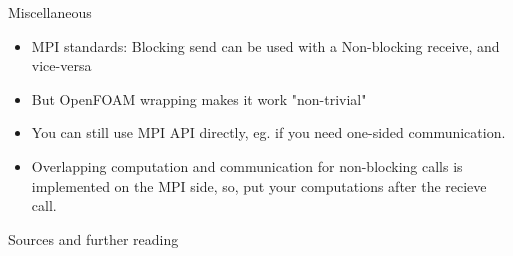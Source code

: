 \begin{frame}[fragile]{Miscellaneous}
    \begin{itemize}
        \item MPI standards: Blocking send can be used with a Non-blocking receive, and vice-versa
        \item But OpenFOAM wrapping makes it work "non-trivial"
    \end{itemize}
    \begin{itemize}
        \item You can still use MPI API directly, eg.  if you need one-sided communication.
    \end{itemize}
    \begin{itemize}
        \item Overlapping computation and communication for non-blocking calls is implemented on the MPI side, so,
        put your computations after the recieve call.
    \end{itemize}
\end{frame}


\begin{frame}[allowframebreaks]{Sources and further reading}
\printbibliography[heading=none]
\end{frame}

